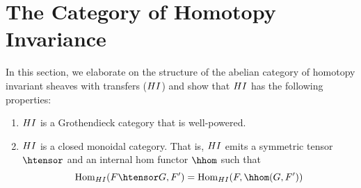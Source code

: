 \section{The Category of Homotopy Invariance}

In this section, we elaborate on the structure of the abelian
category of homotopy invariant sheaves with transfers ($HI$) and 
show that $HI$ has the following properties:

\begin{enumerate}

\item $HI$ is a Grothendieck category that is well-powered.

\item $HI$ is a closed monoidal category. That is, $HI$ 
emits a symmetric tensor $\htensor$ and an internal hom
functor $\hhom$ such that
\[
\hom_{\HI}(F \htensor G, F') = \hom_{\HI}(F, \hhom(G, F'))
\]
\end{enumerate}
